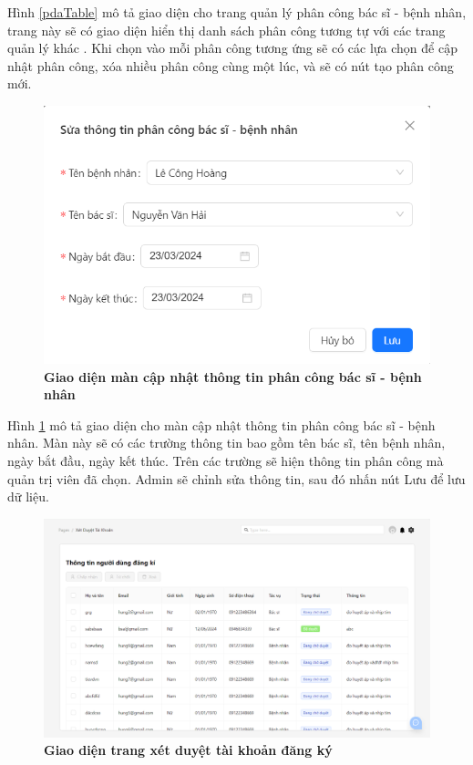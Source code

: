 Hình \ref{pdaTable} mô tả giao diện cho trang quản lý phân công bác sĩ - bệnh nhân, trang này sẽ có giao diện hiển thị danh sách phân công tương tự với các trang quản lý khác . 
Khi chọn vào mỗi phân công tương ứng sẽ có các lựa chọn để cập nhật phân công, xóa nhiều phân công cùng một lúc, và sẽ có nút tạo phân công mới. 

\begin{figure}[H]
  \centering
  \includegraphics[scale=0.7]{Images/server/webUI/editPDA.png}
  \caption[Giao diện màn cập nhật thông tin phân công bác sĩ - bệnh nhân]{\bfseries \fontsize{12pt}{0pt}\selectfont Giao diện màn cập nhật thông tin phân công bác sĩ - bệnh nhân}
  \label{editPDA} %
\end{figure}

Hình \ref{editPDA} mô tả giao diện cho màn cập nhật thông tin phân công bác sĩ - bệnh nhân. Màn này sẽ có các trường thông tin bao gồm 
tên bác sĩ, tên bệnh nhân, ngày bắt đầu, ngày kết thúc. Trên các trường sẽ hiện thông tin phân công mà quản trị viên đã chọn. 
Admin sẽ chỉnh sửa thông tin, sau đó nhấn nút Lưu để lưu dữ liệu.

\begin{figure}[H]
  \centering
  \includegraphics[scale=0.5]{Images/server/webUI/registerTable.png}
  \caption[Giao diện trang quản lý phê duyệt tài khoản]{\bfseries \fontsize{12pt}{0pt}\selectfont Giao diện trang xét duyệt tài khoản đăng ký}
  \label{registerTable} %
\end{figure}

